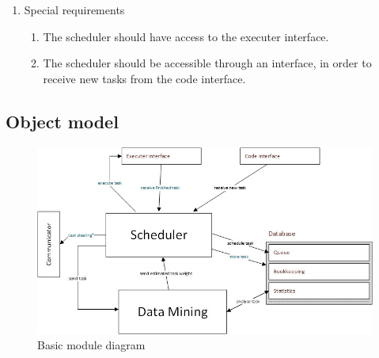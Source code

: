 \begin{enumerate}[1. ]
\item Special requirements

\begin{enumerate}
\item The scheduler should have access to the executer interface.
\item The scheduler should be accessible through an interface, in order to receive new tasks from the code interface.
\end{enumerate}

\end{enumerate}

\subsection{Object model}
	\begin{figure}[H]
		\includegraphics[width=15cm]{images/modules.jpg}
		\caption{Basic module diagram}
	\end{figure}

